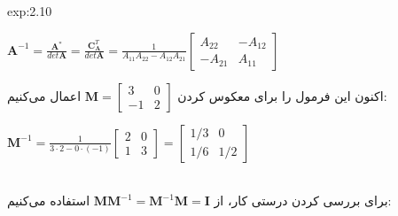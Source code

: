 {\begin{spacing}{1.5}
\begin{example}{exp:2.10}
            \begin{center}
                $\textbf{A}^{-1}=\frac{\displaystyle \textbf{A}^{*}}{\displaystyle det\textbf{A}}=\frac{\displaystyle \textbf{C}^{T}_{\textbf{A}}}{\displaystyle det\textbf{A}}=\frac{\displaystyle 1}{\displaystyle A_{11}A_{22}-A_{12}A_{21}}\begin{bmatrix}
                                                                                                                                                                                                                                                   A_{22}  & -A_{12} \\
                                                                                                                                                                                                                                                   -A_{21} & A_{11}
                \end{bmatrix}$
            \end{center}

            اکنون این فرمول را برای معکوس کردن $\textbf{M}=\begin{bmatrix}
                                                               3  & 0 \\
                                                               -1 & 2
            \end{bmatrix}$ اعمال می‌کنیم:

            \begin{center}
                $\textbf{M}^{-1}=\frac{\displaystyle 1}{\displaystyle 3\cdot 2-0\cdot(-1)}\begin{bmatrix}
                                                                                              2 & 0 \\
                                                                                              1 & 3
                \end{bmatrix}=\begin{bmatrix}
                                  1/3 & 0   \\
                                  1/6 & 1/2
                \end{bmatrix}$
            \end{center}

            \\برای بررسی کردن درستی کار، از $\textbf{M}\textbf{M}^{-1}=\textbf{M}^{-1}\textbf{M}=\textbf{I}$ استفاده می‌کنیم:


\end{example}
\end{spacing}}
